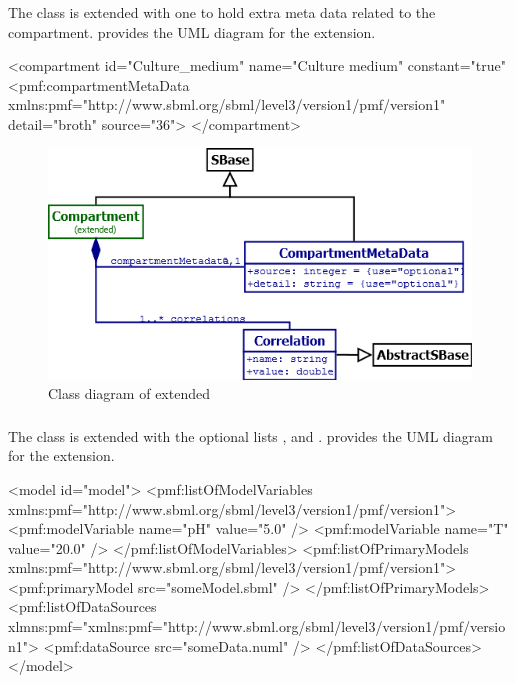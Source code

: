 \subsubsection{}
The \Compartment class is extended with one \CompartmentMetaData to hold extra
meta data related to the compartment.  provides the UML
diagram for the extension.

\begin{example}
<compartment id="Culture_medium" name="Culture medium" constant="true"
  <pmf:compartmentMetaData xmlns:pmf="http://www.sbml.org/sbml/level3/version1/pmf/version1"
    detail="broth" source="36">
</compartment>
\end{example}

\begin{figure}
	\includegraphics[scale=0.8]{img/compartment_uml}
	\caption{Class diagram of extended \Compartment}
	\label{compartment_uml}
\end{figure}

\subsubsection{}
The \Model class is extended with the optional lists \ListOfPrimaryModels,
\ListOfDataSources and \ListOfPrimaryModels.  provides the UML
diagram for the extension.

\begin{example}
<model id="model">
  <pmf:listOfModelVariables xmlns:pmf="http://www.sbml.org/sbml/level3/version1/pmf/version1">
    <pmf:modelVariable name="pH" value="5.0" />
    <pmf:modelVariable name="T" value="20.0" />
  </pmf:listOfModelVariables>
  <pmf:listOfPrimaryModels xmlns:pmf="http://www.sbml.org/sbml/level3/version1/pmf/version1">
    <pmf:primaryModel src="someModel.sbml" />
  </pmf:listOfPrimaryModels>
  <pmf:listOfDataSources
    xlmns:pmf="xmlns:pmf="http://www.sbml.org/sbml/level3/version1/pmf/version1">
    <pmf:dataSource src="someData.numl" />
  </pmf:listOfDataSources>
</model>
\end{example}

